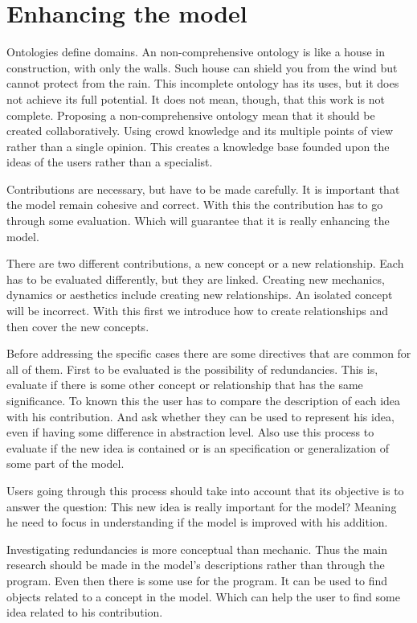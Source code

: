 \section{Enhancing the model}

Ontologies define domains. An non-comprehensive ontology is like a house in construction, with only the walls. Such house can shield you from the wind but cannot protect from the rain. This incomplete ontology has its uses, but it does not achieve its full potential. It does not mean, though, that this work is not complete. Proposing a non-comprehensive ontology mean that it should be created collaboratively. Using crowd knowledge and its multiple points of view rather than a single opinion. This creates a knowledge base founded upon the ideas of the users rather than a specialist.

Contributions are necessary, but have to be made carefully. It is important that the model remain cohesive and correct. With this the contribution has to go through some evaluation. Which will guarantee that it is really enhancing the model.

There are two different contributions, a new concept or a new relationship. Each has to be evaluated differently, but they are linked. Creating new mechanics, dynamics or aesthetics include creating new relationships. An isolated concept will be incorrect. With this first we introduce how to create relationships and then cover the new concepts. 

Before addressing the specific cases there are some directives that are common for all of them. First to be evaluated is the possibility of redundancies. This is, evaluate if there is some other concept or relationship that has the same significance. To known this the user has to compare the description of each idea with his contribution. And ask whether they can be used to represent his idea, even if having some difference in abstraction level. Also use this process to evaluate if the new idea is contained or is an specification or generalization of some part of the model.

Users going through this process should take into account that its objective is to answer the question: This new idea is really important for the model? Meaning he need to focus in understanding if the model is improved with his addition. 

Investigating redundancies is more conceptual than mechanic. Thus the main research should be made in the model's descriptions rather than through the program. Even then there is some use for the program. It can be used to find objects related to a concept in the model. Which can help the user to find some idea related to his contribution.


